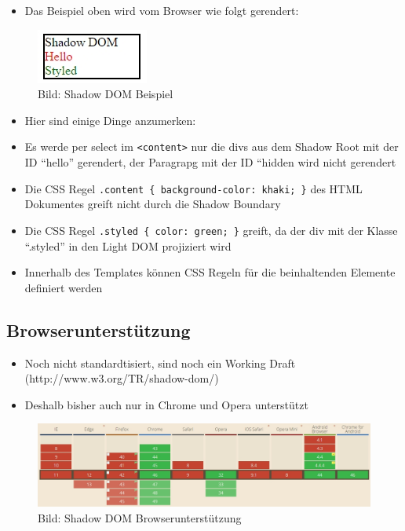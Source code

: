 \begin{itemize}
\tightlist
\item
  Das Beispiel oben wird vom Browser wie folgt gerendert:
\end{itemize}

\begin{figure}[htbp]
\centering
\includegraphics{images/2-shadow-dom-beispiel.jpg}
\caption{Bild: Shadow DOM Beispiel}
\end{figure}

\begin{itemize}
\tightlist
\item
  Hier sind einige Dinge anzumerken:
\item
  Es werde per select im \texttt{\textless{}content\textgreater{}} nur
  die divs aus dem Shadow Root mit der ID ``hello'' gerendert, der
  Paragrapg mit der ID ``hidden wird nicht gerendert
\item
  Die CSS Regel \texttt{.content\ \{\ background-color:\ khaki;\ \}} des
  HTML Dokumentes greift nicht durch die Shadow Boundary
\item
  Die CSS Regel \texttt{.styled\ \{\ color:\ green;\ \}} greift, da der
  div mit der Klasse ``.styled'' in den Light DOM projiziert wird
\item
  Innerhalb des Templates können CSS Regeln für die beinhaltenden
  Elemente definiert werden
\end{itemize}

\subsection{Browserunterstützung}\label{browserunterstuxfctzung}

\begin{itemize}
\tightlist
\item
  Noch nicht standardtisiert, sind noch ein Working Draft
  (http://www.w3.org/TR/shadow-dom/)
\item
  Deshalb bisher auch nur in Chrome und Opera unterstützt
\end{itemize}

\begin{figure}[htbp]
\centering
\includegraphics{images/2-shadow-dom-browserunterstuetzung.jpg}
\caption{Bild: Shadow DOM Browserunterstützung}
\end{figure}

